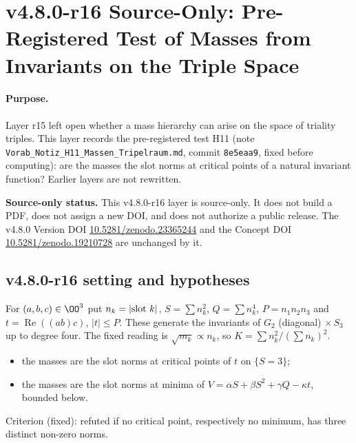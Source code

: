 \clearpage
\section*{v4.8.0-r16 Source-Only: Pre-Registered Test of Masses from Invariants on the Triple Space}
\label{sec:v480-r16-triple-space-masses}

\paragraph{Purpose.}
Layer r15 left open whether a mass hierarchy can arise on the space of triality triples.  This layer records the
pre-registered test H11 (note \texttt{Vorab\_Notiz\_H11\_Massen\_Tripelraum.md}, commit \texttt{8e5eaa9}, fixed
before computing): are the masses the slot norms at critical points of a natural invariant function?  Earlier
layers are not rewritten.

\noindent\textbf{Source-only status.}
This v4.8.0-r16 layer is source-only.  It does not build a PDF, does not assign a new DOI,
and does not authorize a public release.  The v4.8.0 Version DOI
\href{https://doi.org/10.5281/zenodo.23365244}{10.5281/zenodo.23365244} and the Concept DOI
\href{https://doi.org/10.5281/zenodo.19210728}{10.5281/zenodo.19210728} are unchanged by it.

\subsection*{v4.8.0-r16 setting and hypotheses}
\label{subsec:v480-r16-setting}

For \((a,b,c)\in\OO^3\) put \(n_k=|{\rm slot}\ k|\), \(S=\sum n_k^2\), \(Q=\sum n_k^4\), \(P=n_1n_2n_3\) and
\(t=\operatorname{Re}((ab)c)\), \(|t|\le P\).  These generate the invariants of \(G_2\) (diagonal)
\(\times\,S_3\) up to degree four.  The fixed reading is \(\sqrt{m_k}\propto n_k\), so
\(K=\sum n_k^2/(\sum n_k)^2\).
\begin{itemize}
\item[H11a:] the masses are the slot norms at critical points of \(t\) on \(\{S=3\}\);
\item[H11b:] the masses are the slot norms at minima of
\(V=\alpha S+\beta S^2+\gamma Q-\kappa t\), bounded below.
\end{itemize}
Criterion (fixed): refuted if no critical point, respectively no minimum, has three distinct non-zero norms.


